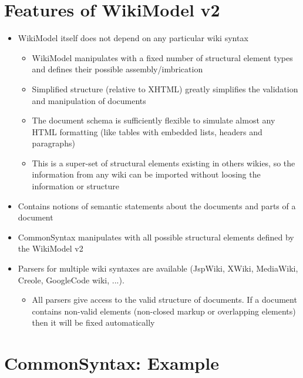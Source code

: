 \documentclass{article}
\begin{document}
\section{Features of WikiModel v2}
\begin{itemize}
 \item WikiModel itself does not depend on any particular wiki syntax\begin{itemize}
 \item WikiModel manipulates with a fixed number of structural element types and defines their possible assembly/imbrication
 \item Simplified structure (relative to XHTML)  greatly simplifies the validation and manipulation of documents
 \item The document schema is sufficiently flexible to simulate almost any HTML formatting (like tables with embedded lists, headers and paragraphs)
 \item This is a super-set of structural elements existing in others wikies, so the information from any wiki can be imported without loosing the information or structure
\end{itemize}

 \item Contains notions of semantic statements about the  documents and parts of a document
 \item CommonSyntax manipulates with all possible structural elements defined by the WikiModel v2
 \item Parsers for multiple wiki syntaxes are available (JspWiki, XWiki, MediaWiki, Creole, GoogleCode wiki, ...). \begin{itemize}
 \item All parsers give access to the valid structure of documents. If a document contains non-valid elements (non-closed markup or overlapping elements) then it will be fixed automatically
\end{itemize}

\end{itemize}

\section{CommonSyntax: Example}
\end{document}
